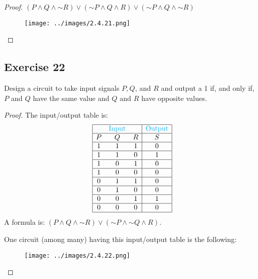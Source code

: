 \documentclass[14pt]{extarticle}
\begin{document}
\begin{proof}
    $(P \wedge Q \wedge {\sim R}) \vee ({\sim P} \wedge Q \wedge R)
        \vee ({\sim P} \wedge Q \wedge {\sim R})$

    \begin{figure}[ht!]
        \centering
        \texttt{[image: ../images/2.4.21.png]}
    \end{figure}
\end{proof}

\subsection{Exercise 22}
Design a circuit to take input signals $P, Q$, and $R$ and output a 1 if, and only if, $P$ and $Q$ have the same value and $Q$ and $R$ have opposite values.

\begin{proof}
    The input/output table is:
    $$
        \begin{array}{|ccc|c|}
            \hline
              & \color{cyan}\text{Input} &   & \color{cyan}\text{Output} \\ \hline
            P & Q                        & R & S                         \\
            \hline
            1 & 1                        & 1 & 0                         \\
            \hline
            1 & 1                        & 0 & 1                         \\
            \hline
            1 & 0                        & 1 & 0                         \\
            \hline
            1 & 0                        & 0 & 0                         \\
            \hline
            0 & 1                        & 1 & 0                         \\
            \hline
            0 & 1                        & 0 & 0                         \\
            \hline
            0 & 0                        & 1 & 1                         \\
            \hline
            0 & 0                        & 0 & 0                         \\
            \hline
        \end{array}
    $$
    A formula is: $(P \wedge Q \wedge {\sim R}) \vee ({\sim P} \wedge {\sim Q} \wedge R)$.

    One circuit (among many) having this input/output table is the following:

    \begin{figure}[ht!]
        \centering
        \texttt{[image: ../images/2.4.22.png]}
    \end{figure}
\end{proof}
\end{document}
